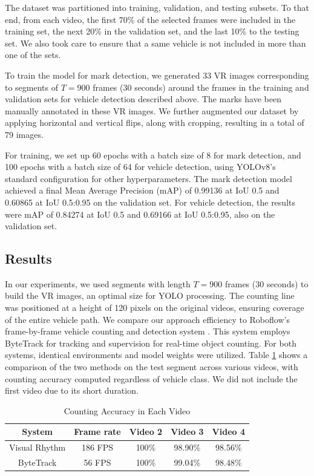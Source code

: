 \documentclass[10pt,conference]{IEEEtran}
\begin{document}
The dataset was partitioned into training, validation, and testing subsets. To that end, from each video, the first 70\% of the selected frames were included in the training set, the next 20\% in the validation set, and the last 10\% to the testing set. We also took care to ensure that a same vehicle is not included in more than one of the sets. 

To train the model for mark detection, we generated 33 VR images corresponding to segments of $T=900$ frames (30 seconds) around the frames in the training and validation sets for vehicle detection described above. The marks have been manually annotated in these VR images. We further augmented our dataset by applying horizontal and vertical flips, along with cropping, resulting in a total of 79 images.

For training, we set up 60 epochs with a batch size of 8 for mark detection, and 100 epochs with a batch size of 64 for vehicle detection, using YOLOv8's standard configuration for other hyperparameters. The mark detection model achieved a final Mean Average Precision (mAP) of 0.99136 at IoU 0.5 and 0.60865 at IoU 0.5:0.95 on the validation set. For vehicle detection, the results were mAP of 0.84274 at IoU 0.5 and 0.69166 at IoU 0.5:0.95, also on the validation set.

\subsection{Results}
In our experiments, we used segments with length $T=900$ frames (30 seconds) to build the VR images, an optimal size for YOLO processing. The counting line was positioned at a height of 120 pixels on the original videos, ensuring coverage of the entire vehicle path. We compare our approach efficiency to Roboflow's frame-by-frame vehicle counting and detection system \cite{roboflow}. This system employs ByteTrack for tracking and supervision for real-time object counting. For both systems, identical environments and model weights were utilized. %
Table \ref{tab:test1} shows a comparison of the two methods  on the test segment across various videos, with counting accuracy computed regardless of vehicle class. We did not include the first video due to its short duration.

\begin{table}[htp]
\renewcommand{\arraystretch}{1.3}
    \caption{Counting Accuracy in Each Video}
    \label{tab:test1}
    \centering
    \begin{tabular}{|c||c||c||c||c|}
        \hline
        System & Frame rate & Video 2 & Video 3 & Video 4\\
        \hline
        Visual Rhythm & 186 FPS & 100\% & 98.90\%  & 98.56\% \\
        \hline
        ByteTrack & 56 FPS & 100\% & 99.04\% & 98.48\%\\
    \hline
    \end{tabular}
\end{table}
\end{document}
